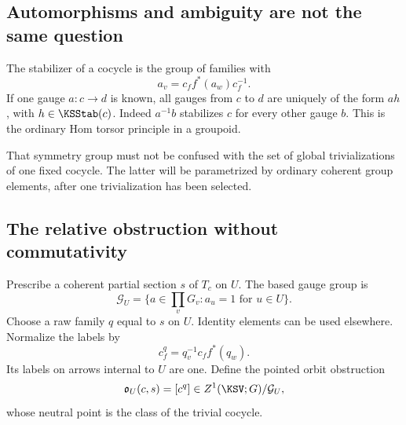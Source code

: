 \subsection{Automorphisms and ambiguity are not the same question}
The stabilizer of a cocycle is the group of families with
\[
 a_v=c_f f^*(a_w)c_f^{-1}.
\]
If one gauge \(a:c\to d\) is known, all gauges from \(c\) to \(d\) are uniquely of the form \(ah\), with \(h\in\KSStab(c)\). Indeed \(a^{-1}b\) stabilizes \(c\) for every other gauge \(b\). This is the ordinary Hom torsor principle in a groupoid.

That symmetry group must not be confused with the set of global trivializations of one fixed cocycle. The latter will be parametrized by ordinary coherent group elements, after one trivialization has been selected.

\subsection{The relative obstruction without commutativity}
Prescribe a coherent partial section \(s\) of \(T_c\) on \(U\). The based gauge group is
\[
 \mathcal G_U=\{a\in\prod_vG_v:a_u=1\text{ for }u\in U\}.
\]
Choose a raw family \(q\) equal to \(s\) on \(U\). Identity elements can be used elsewhere. Normalize the labels by
\[
 c^q_f=q_v^{-1}c_f f^*(q_w).
\]
Its labels on arrows internal to \(U\) are one. Define the pointed orbit obstruction
\[
 \mathfrak o_U(c,s)=[c^q]\in Z^1(\KSV;G)/\mathcal G_U,
\]
whose neutral point is the class of the trivial cocycle.

